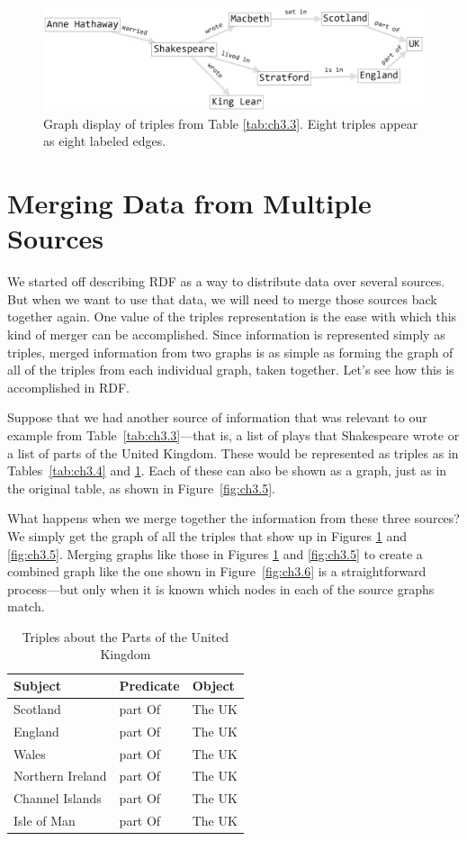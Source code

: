 \begin{figure}
    \centering
    \includegraphics[width=5.0in]{SWWOv3/media/ch3/figure3-4.png}
    \caption{Graph display of triples from Table \ref{tab:ch3.3}. Eight triples appear as eight labeled edges.}
    \label{fig:ch3.4}
\end{figure}


\section{Merging Data from Multiple Sources}

We started off describing RDF as a way to distribute data over several
sources. But when we want to use that data, we will need to merge those
sources back together again. One value of the triples representation is
the ease with which this kind of merger can be accomplished. Since
information is represented simply as triples, merged information from
two graphs is as simple as forming the graph of all of the triples from
each individual graph, taken together. Let's see how this is
accomplished in RDF.

Suppose that we had another source of information that was relevant to
our example from Table~\ref{tab:ch3.3}---that is, a list of plays that Shakespeare wrote or a list of parts
of the United Kingdom. These would be represented as triples as in
Tables~\ref{tab:ch3.4} and \ref{tab:ch3.5}. Each of these can also be shown as a graph, just as
in the original table, as shown in Figure~\ref{fig:ch3.5}.

What happens when we merge together the information from these three
sources? We simply get the graph of all the triples that show up in
Figures \ref{fig:ch3.4} and \ref{fig:ch3.5}. Merging graphs like those in 
Figures \ref{fig:ch3.4} and \ref{fig:ch3.5} to
create a combined graph like the one shown in Figure~\ref{fig:ch3.6} is a
straightforward process---but only when it is known which nodes in each
of the source graphs match.

\begin{table}[h]
\centering
\begin{tabular}{||l l l||} 
 \hline
 Subject&Predicate&Object \\ [0.5ex] 
 \hline\hline
Scotland&part Of&The UK \\
England&part Of&The UK \\
Wales&part Of&The UK\\
Northern Ireland&part Of&The UK \\
Channel Islands&part Of&The UK\\
Isle of Man&part Of&The UK\\
\hline
\end{tabular}
\caption{Triples about the Parts of the United Kingdom}
\label{tab:ch3.5}
\end{table}

